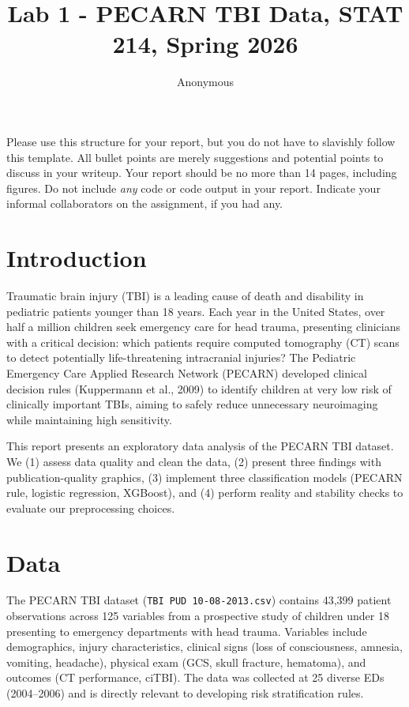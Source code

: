 \documentclass[10pt,letterpaper]{article}
\title{Lab 1 - PECARN TBI Data, STAT 214, Spring 2026}
\author{Anonymous}
\begin{document}
\maketitle

Please use this structure for your report, but you do not have to
slavishly follow this template. All bullet points are merely suggestions
and potential points to discuss in your writeup. Your report should be
no more than 14 pages, including figures. Do not include \emph{any} code
or code output in your report. Indicate your informal collaborators on
the assignment, if you had any.

\section{Introduction}\label{introduction}

Traumatic brain injury (TBI) is a leading cause of death and disability in pediatric patients younger than 18 years. Each year in the United States, over half a million children seek emergency care for head trauma, presenting clinicians with a critical decision: which patients require computed tomography (CT) scans to detect potentially life-threatening intracranial injuries? The Pediatric Emergency Care Applied Research Network (PECARN) developed clinical decision rules (Kuppermann et al., 2009) to identify children at very low risk of clinically important TBIs, aiming to safely reduce unnecessary neuroimaging while maintaining high sensitivity.

This report presents an exploratory data analysis of the PECARN TBI dataset. We (1) assess data quality and clean the data, (2) present three findings with publication-quality graphics, (3) implement three classification models (PECARN rule, logistic regression, XGBoost), and (4) perform reality and stability checks to evaluate our preprocessing choices.


\section{Data}\label{data}

The PECARN TBI dataset (\texttt{TBI PUD 10-08-2013.csv}) contains 43,399 patient observations across 125 variables from a prospective study of children under 18 presenting to emergency departments with head trauma. Variables include demographics, injury characteristics, clinical signs (loss of consciousness, amnesia, vomiting, headache), physical exam (GCS, skull fracture, hematoma), and outcomes (CT performance, ciTBI). The data was collected at 25 diverse EDs (2004--2006) and is directly relevant to developing risk stratification rules.
\end{document}
